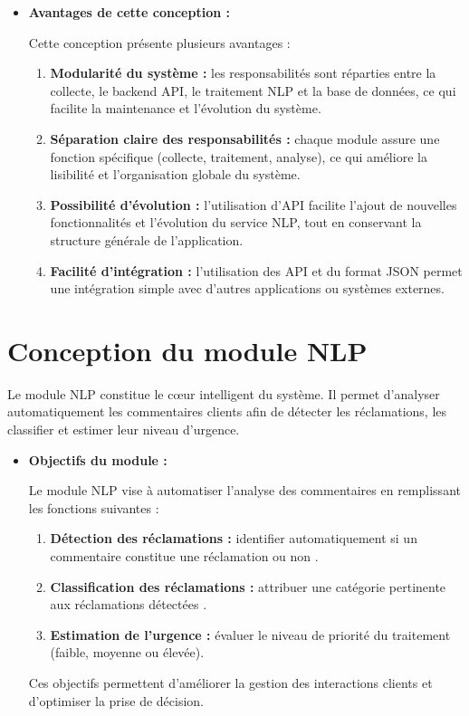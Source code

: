 \documentclass[12pt,a4paper,oneside]{report}
\begin{document}
\begin{itemize}
    \item \textbf{Avantages de cette conception :}

Cette conception présente plusieurs avantages :

\begin{enumerate}
    \item \textbf{Modularité du système :} les responsabilités sont réparties entre la collecte, le backend API, le traitement NLP et la base de données, ce qui facilite la maintenance et l’évolution du système.
    
    \item \textbf{Séparation claire des responsabilités :} chaque module assure une fonction spécifique (collecte, traitement, analyse), ce qui améliore la lisibilité et l’organisation globale du système.
    
    \item \textbf{Possibilité d’évolution :} l’utilisation d’API facilite l’ajout de nouvelles fonctionnalités et l’évolution du service NLP, tout en conservant la structure générale de l’application.
    
    \item \textbf{Facilité d’intégration :} l’utilisation des API et du format JSON permet une intégration simple avec d’autres applications ou systèmes externes.
\end{enumerate}
\end{itemize}

\section{Conception du module NLP}
Le module NLP constitue le cœur intelligent du système. Il permet d’analyser automatiquement les commentaires clients afin de détecter les réclamations, les classifier et estimer leur niveau d’urgence.

\begin{itemize}
    \item \textbf{Objectifs du module :}

\vspace{0.3cm}
Le module NLP vise à automatiser l’analyse des commentaires en remplissant les fonctions suivantes :

\begin{enumerate}
    \item \textbf{Détection des réclamations :} identifier automatiquement si un commentaire constitue une réclamation ou non .
    \item \textbf{Classification des réclamations :} attribuer une catégorie pertinente aux réclamations détectées .
    \item \textbf{Estimation de l’urgence :} évaluer le niveau de priorité du traitement (faible, moyenne ou élevée).
\end{enumerate}

Ces objectifs permettent d’améliorer la gestion des interactions clients et d’optimiser la prise de décision.
\end{itemize}
\end{document}
